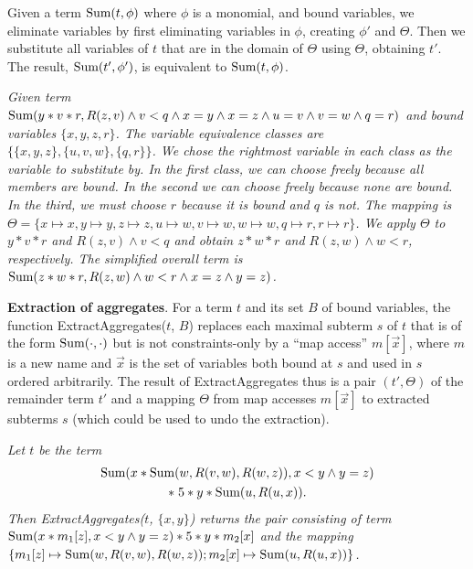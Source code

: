 Given a term $\mbox{Sum}(t,\phi)$ where $\phi$ is a monomial,
and bound variables, we eliminate variables by 
first eliminating variables in $\phi$, creating $\phi'$ and $\Theta$.
Then we substitute all variables of $t$ that are in the domain of $\Theta$
using $\Theta$, obtaining $t'$. The result, $\mbox{Sum}(t', \phi')$, is equivalent
to $\mbox{Sum}(t,\phi)$.


\begin{example} \em
Given term $\mbox{Sum}(y*v*r, R(z, v) \land v<q
\land x=y \land x=z \land u=v \land v=w \land q=r)$
and bound variables $\{x,y,z,r\}$.
The variable equivalence classes are
$\{ \{x,y,z\}, \{u,v,w\}, \{q,r\} \}$. We chose the rightmost variable in
each class as the variable to substitute by. In the first class, we can choose
freely because all members are bound. In the second we can choose freely
because none are bound. In the third, we must choose $r$ because it is bound
and $q$ is not.
The mapping is
$\Theta = \{ x \mapsto x, y \mapsto y, z \mapsto z, u \mapsto w, v \mapsto w,
w \mapsto w, q \mapsto r, r \mapsto r \}$.
We apply $\Theta$ to $y*v*r$ and $R(z, v) \land v < q$ and obtain
$z*w*r$ and $R(z,w) \land w<r$, respectively. The simplified
overall term is
$\mbox{Sum}(z*w*r, R(z,w) \land w<r \land x=z \land y=z)$.
\punto
\end{example}


{\bf Extraction of aggregates}.
For a term $t$ and its set $B$ of bound variables,
the function ExtractAggregates($t$, $B$)
replaces each maximal subterm $s$ of $t$
that is of the form $\mbox{Sum}(\cdot, \cdot)$ but is not constraints-only
by a ``map access''  $m[\vec{x}]$, where
$m$ is a new name and $\vec{x}$ is the set of variables
both bound at $s$ and used in $s$ ordered arbitrarily.
The result of ExtractAggregates thus is a pair $(t', \Theta)$ of the remainder
term $t'$ and a mapping $\Theta$ from map accesses $m[\vec{x}]$ to extracted
subterms $s$ (which could be used to undo the extraction).

\begin{example}\em
Let $t$ be the term
\begin{multline*}
\mbox{Sum}(x*\mbox{Sum}(w, R(v, w), R(w, z)), x<y \land y=z) \\
*\; 5 * y * \mbox{Sum}(u, R(u, x)).
\end{multline*}
Then ExtractAggregates($t$, $\{x,y\}$) returns the pair consisting of term
$\mbox{Sum}(x*m_1[z], x<y \land y=z) * 5 * y * m_2[x]$
and the mapping
$\{
m_1[z] \mapsto \mbox{Sum}(w, R(v, w), R(w, z));
m_2[x] \mapsto \mbox{Sum}(u, R(u, x))
\}$.
\punto
\end{example}


